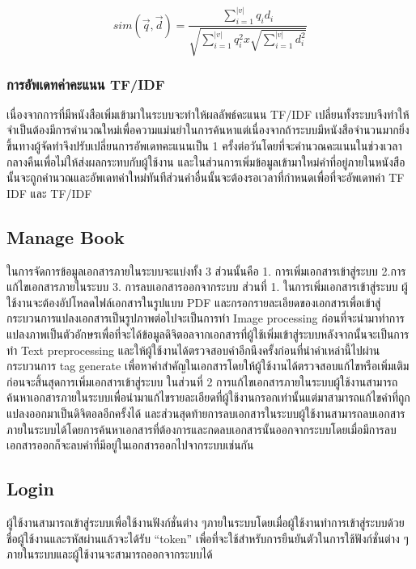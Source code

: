 \begin{equation}
    sim(\vec{q},\vec{d})=\frac{\sum_{i=1}^{|v|}q_{i}d_{i} }{\sqrt{\sum_{i=1}^{|v|}q^{2}_{i}x\sqrt{\sum_{i=1}^{|v|}d^{2}_{i}}}}
    \end{equation}    

\subsubsection{การอัพเดทค่าคะแนน TF/IDF}

เนื่องจากการที่มีหนังสือเพิ่มเข้ามาในระบบจะทำให้ผลลัพธ์คะแนน TF/IDF เปลี่ยนทั้งระบบจึงทำให้จำเป็นต้องมีการคำนวณใหม่เพื่อความแม่นยำในการค้นหาแต่เนื่องจากถ้าระบบมีหนังสือจำนวนมากยิ่งขึ้นทางผู้จัดทำจึงปรับเปลี่ยนการอัพเดทคะแนนเป็น 1 ครั้งต่อวันโดยที่จะคำนวณคะแนนในช่วงเวลากลางคืนเพื่อไม่ให้ส่งผลกระทบกับผู้ใช้งาน และในส่วนการเพิ่มข้อมูลเข้ามาใหม่คำที่อยู่ภายในหนังสือนั้นจะถูกคำนวณและอัพเดทค่าใหม่ทันทีส่วนคำอื่นนั้นจะต้องรอเวลาที่กำหนดเพื่อที่จะอัพเดทค่า TF IDF และ TF/IDF 

\subsection{Manage Book}

ในการจัดการข้อมูลเอกสารภายในระบบจะแบ่งทั้ง 3 ส่วนนั้นคือ 1. การเพิ่มเอกสารเข้าสู่ระบบ 2.การแก้ไขเอกสารภายในระบบ  3. การลบเอกสารออกจากระบบ 
ส่วนที่ 1. ในการเพิ่มเอกสารเข้าสู่ระบบ ผู้ใช้งานจะต้องอัปโหลดไฟล์เอกสารในรูปแบบ PDF และกรอกรายละเอียดของเอกสารเพื่อเข้าสู่กระบวนการแปลงเอกสารเป็นรูปภาพต่อไปจะเป็นการทำ Image processing ก่อนที่จะนำมาทำการแปลงภาพเป็นตัวอักษรเพื่อที่จะได้ข้อมูลดิจิตอลจากเอกสารที่ผู้ใช้เพิ่มเข้าสู่ระบบหลังจากนั้นจะเป็นการทำ Text preprocessing และให้ผู้ใช้งานได้ตรวจสอบคำอีกนึงครั้งก่อนที่นำคำเหล่านี้ไปผ่านกระบวนการ tag generate เพื่อหาคำสำคัญในเอกสารโดยให้ผู้ใช้งานได้ตรวจสอบแก้ไขหรือเพิ่มเติมก่อนจะสิ้นสุดการเพิ่มเอกสารเข้าสู่ระบบ ในส่วนที่ 2 การแก้ไขเอกสารภายในระบบผู้ใช้งานสามารถค้นหาเอกสารภายในระบบเพื่อนำมาแก้ไขรายละเอียดที่ผู้ใช้งานกรอกเท่านั้นแต่มาสามารถแก้ไขคำที่ถูกแปลงออกมาเป็นดิจิตอลอีกครั้งได้ และส่วนสุดท้ายการลบเอกสารในระบบผู้ใช้งานสามารถลบเอกสารภายในระบบได้โดยการค้นหาเอกสารที่ต้องการและกดลบเอกสารนั้นออกจากระบบโดยเมื่อมีการลบเอกสารออกก็จะลบคำที่มีอยู่ในเอกสารออกไปจากระบบเช่นกัน

\subsection{Login}

ผู้ใช้งานสามารถเข้าสู่ระบบเพื่อใช้งานฟังก์ชั่นต่าง ๆภายในระบบโดยเมื่อผู้ใช้งานทำการเข้าสู่ระบบด้วยชื่อผู้ใช้งานและรหัสผ่านแล้วจะได้รับ “token” เพื่อที่จะใช้สำหรับการยืนยันตัวในการใช้ฟังก์ชั่นต่าง ๆภายในระบบและผู้ใช้งานจะสามารถออกจากระบบได้

